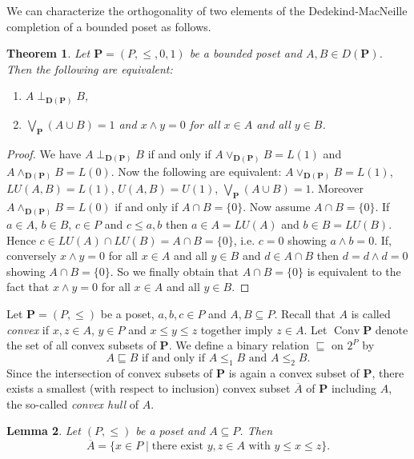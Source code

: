 \documentclass[12pt]{article}
\DeclareMathOperator{\Conv}{Conv}
\newtheorem{theorem}{Theorem}[section]
\newtheorem{lemma}[theorem]{Lemma}
\begin{document}
We can characterize the orthogonality of two elements of the Dedekind-MacNeille completion of a bounded poset as follows.

\begin{theorem}
Let $\mathbf P=(P,\le,0,1)$ be a bounded poset and $A,B\in D(\mathbf P)$. Then the following are equivalent:
\begin{enumerate}[{\rm(i)}]
\item $A\perp_{\mathbf D(\mathbf P)}B$,
\item $\bigvee_\mathbf P(A\cup B)=1$ and $x\wedge y=0$ for all $x\in A$ and all $y\in B$.
\end{enumerate}		
\end{theorem}

\begin{proof}
We have	$A\perp_{\mathbf D(\mathbf P)}B$ if and only if $A\vee_{\mathbf D(\mathbf P)}B=L(1)$ and $A\wedge_{\mathbf D(\mathbf P)}B=L(0)$. Now the following are equivalent: $A\vee_{\mathbf D(\mathbf P)}B=L(1)$, $LU(A,B)=L(1)$, $U(A,B)=U(1)$, $\bigvee_\mathbf P(A\cup B)=1$. Moreover $A\wedge_{\mathbf D(\mathbf P)}B=L(0)$ if and only if $A\cap B=\{0\}$. Now assume $A\cap B=\{0\}$. If $a\in A$, $b\in B$, $c\in P$ and $c\le a,b$ then $a\in A=LU(A)$ and $b\in B=LU(B)$. Hence $c\in LU(A)\cap LU(B)=A\cap B=\{0\}$, i.e. $c=0$ showing $a\wedge b=0$. If, conversely $x\wedge y=0$ for all $x\in A$ and all $y\in B$ and $d\in A\cap B$ then $d=d\wedge d=0$ showing $A\cap B=\{0\}$. So we finally obtain that $A\cap B=\{0\}$ is equivalent to the fact that $x\wedge y=0$ for all $x\in A$ and all $y\in B$.
\end{proof}

Let $\mathbf P=(P,\le)$ be a poset, $a,b,c\in P$ and $A,B\subseteq P$. Recall that $A$ is called {\em convex} if $x,z\in A$, $y\in P$ and $x\le y\le z$ together imply $z\in A$. Let $\Conv\mathbf P$ denote the set of all convex subsets of $\mathbf P$. We define a binary relation $\sqsubseteq$ on $2^P$ by
\[
A\sqsubseteq B\text{ if and only if }A\le_1B\text{ and }A\le_2B.
\]
Since the intersection of convex subsets of $\mathbf P$ is again a convex subset of $\mathbf P$, there exists a smallest (with respect to inclusion) convex subset $\overline A$ of $\mathbf P$ including $A$, the so-called {\em convex hull} of $A$.

\begin{lemma}
Let $(P,\le)$ be a poset and $A\subseteq P$. Then
\[
\overline A=\{x\in P\mid\text{there exist }y,z\in A\text{ with }y\le x\le z\}.
\]
\end{lemma}
\end{document}

